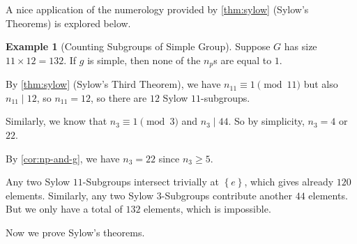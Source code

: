 \documentclass{article}
\theoremstyle{definition}
\newtheorem*{example*}{Example}
\theoremstyle{remark}
\newcommand{\Bqty}[1]{\left\{#1\right\}}
\newcommand{\divides}{\mid}
\begin{document}
A nice application of the numerology provided by \autoref{thm:sylow} (Sylow's Theorems) is explored below.

\begin{example*}[Counting Subgroups of Simple Group]
    Suppose \(G\) has size \(11 \times 12 = 132\). If \(g\) is simple, then none of the \(n_p\)s are equal to \(1\).

    By \autoref{thm:sylow} (Sylow's Third Theorem), we have \(n_{11} \equiv 1 \pmod{11}\) but also \(n_{11} \divides 12\), so \(n_{11} = 12\), so there are \(12\) Sylow \(11\)-subgroups.

    Similarly, we know that \(n_3 \equiv 1 \pmod{3}\) and \(n_3 \divides 44\). So by simplicity, \(n_3 = 4\) or \(22\).

    By \autoref{cor:np-and-g}, we have \(n_3 = 22\) since \(n_3 \geq 5\).

    Any two Sylow \(11\)-Subgroups intersect trivially at \(\Bqty{e}\), which gives already \(120\) elements. Similarly, any two Sylow \(3\)-Subgroups contribute another \(44\) elements. But we only have a total of \(132\) elements, which is impossible.
\end{example*}

Now we prove Sylow's theorems.
\end{document}
